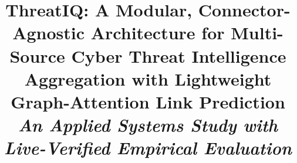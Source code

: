 \documentclass[conference]{IEEEtran}
\begin{document}
\title{ThreatIQ: A Modular, Connector-Agnostic Architecture for Multi-Source Cyber Threat Intelligence Aggregation with Lightweight Graph-Attention Link Prediction\\
\large{\textit{An Applied Systems Study with Live-Verified Empirical Evaluation}}}

\author{
}

\maketitle

\begin{abstract}

\end{abstract}
\end{document}
